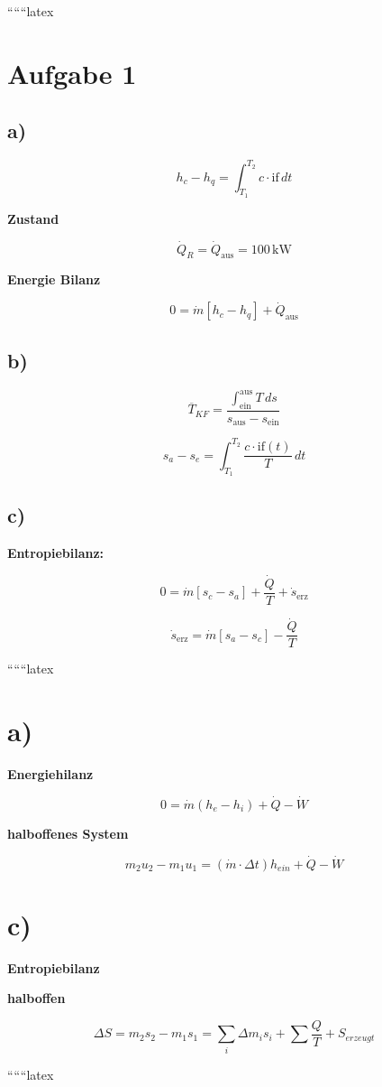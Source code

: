 
``````latex

\section*{Aufgabe 1}

\subsection*{a)}

\[
h_c - h_q = \int_{T_1}^{T_2} c \cdot \text{if} \, dt
\]

\textbf{Zustand}

\[
\dot{Q}_R = \dot{Q}_{\text{aus}} = 100 \, \text{kW}
\]

\textbf{Energie Bilanz}

\[
0 = \dot{m} \left[ h_c - h_q \right] + \dot{Q}_{\text{aus}}
\]

\subsection*{b)}

\[
\overline{T}_{KF} = \frac{\int_{\text{ein}}^{\text{aus}} T \, ds}{s_{\text{aus}} - s_{\text{ein}}}
\]

\[
s_a - s_e = \int_{T_1}^{T_2} \frac{c \cdot \text{if}(t)}{T} \, dt
\]

\subsection*{c)}

\textbf{Entropiebilanz:}

\[
0 = \dot{m} \left[ s_c - s_a \right] + \frac{\dot{Q}}{T} + \dot{s}_{\text{erz}}
\]

\[
\dot{s}_{\text{erz}} = \dot{m} \left[ s_a - s_c \right] - \frac{\dot{Q}}{T}
\]

``````latex

\section*{a)}

\textbf{Energiehilanz}

\[
0 = \dot{m} (h_e - h_i) + \dot{Q} - \dot{W}
\]

\textbf{halboffenes System}

\[
m_2 u_2 - m_1 u_1 = (\dot{m} \cdot \Delta t) h_{ein} + \dot{Q} - \dot{W}
\]

\section*{c)}

\textbf{Entropiebilanz}

\textbf{halboffen}

\[
\Delta S = m_2 s_2 - m_1 s_1 = \sum_i \Delta m_i s_i + \sum \frac{Q}{T} + S_{erzeugt}
\]

``````latex


